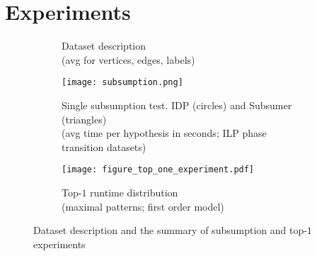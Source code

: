 \section{Experiments}\label{sec:experiments}
\begin{figure}[t]
  \captionsetup{
    skip=-5pt
  }
  \begin{center}
    \begin{subfigure}{.39\textwidth}
      \begin{center}
      \end{center}
      \caption{Dataset description\\ (avg for vertices, edges, labels)}
      \label{table:datasets}
    \end{subfigure}
    \hfill
    \begin{subfigure}{.60\textwidth}
      \phantom{-}
      \texttt{[image: subsumption.png]}
      \caption{Single subsumption test. IDP (circles) and Subsumer (triangles) \\ (avg time per hypothesis in seconds; ILP phase transition datasets)}
      \label{figure:subsumption}
    \end{subfigure}
    \hfill 
    \begin{subfigure}{.70\textwidth}
      \texttt{[image: figure\_top\_one\_experiment.pdf]}
      \caption{Top-$1$ runtime distribution \\(maximal patterns; first order model)}
      \label{fig:fol_top_experiments}
    \end{subfigure}
  \end{center}
  \caption{Dataset description and the summary of subsumption and top-$1$ experiments}
\end{figure}
